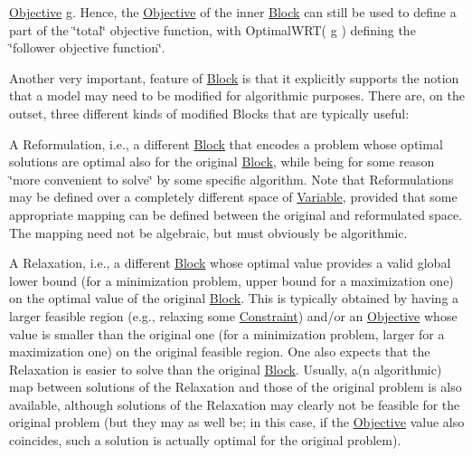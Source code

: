 \mbox{\hyperlink{class_s_m_spp__di__unipi__it_1_1_objective}{Objective}} g. Hence, the \mbox{\hyperlink{class_s_m_spp__di__unipi__it_1_1_objective}{Objective}} of the inner \mbox{\hyperlink{class_s_m_spp__di__unipi__it_1_1_block}{Block}} can still be used to define a part of the \char`\"{}total\char`\"{} objective function, with Optimal\+W\+R\+T( g ) defining the \char`\"{}follower objective function\char`\"{}.

Another very important, feature of \mbox{\hyperlink{class_s_m_spp__di__unipi__it_1_1_block}{Block}} is that it explicitly supports the notion that a model may need to be modified for algorithmic purposes. There are, on the outset, three different kinds of modified Blocks that are typically useful\+:


\begin{DoxyItemize}
\item A Reformulation, i.\+e., a different \mbox{\hyperlink{class_s_m_spp__di__unipi__it_1_1_block}{Block}} that encodes a problem whose optimal solutions are optimal also for the original \mbox{\hyperlink{class_s_m_spp__di__unipi__it_1_1_block}{Block}}, while being for some reason \char`\"{}more convenient to solve\char`\"{} by some specific algorithm. Note that Reformulations may be defined over a completely different space of \mbox{\hyperlink{class_s_m_spp__di__unipi__it_1_1_variable}{Variable}}, provided that some appropriate mapping can be defined between the original and reformulated space. The mapping need not be algebraic, but must obviously be algorithmic.
\item A Relaxation, i.\+e., a different \mbox{\hyperlink{class_s_m_spp__di__unipi__it_1_1_block}{Block}} whose optimal value provides a valid global lower bound (for a minimization problem, upper bound for a maximization one) on the optimal value of the original \mbox{\hyperlink{class_s_m_spp__di__unipi__it_1_1_block}{Block}}. This is typically obtained by having a larger feasible region (e.\+g., relaxing some \mbox{\hyperlink{class_s_m_spp__di__unipi__it_1_1_constraint}{Constraint}}) and/or an \mbox{\hyperlink{class_s_m_spp__di__unipi__it_1_1_objective}{Objective}} whose value is smaller than the original one (for a minimization problem, larger for a maximization one) on the original feasible region. One also expects that the Relaxation is easier to solve than the original \mbox{\hyperlink{class_s_m_spp__di__unipi__it_1_1_block}{Block}}. Usually, a(n algorithmic) map between solutions of the Relaxation and those of the original problem is also available, although solutions of the Relaxation may clearly not be feasible for the original problem (but they may as well be; in this case, if the \mbox{\hyperlink{class_s_m_spp__di__unipi__it_1_1_objective}{Objective}} value also coincides, such a solution is actually optimal for the original problem).

\end{DoxyItemize}
